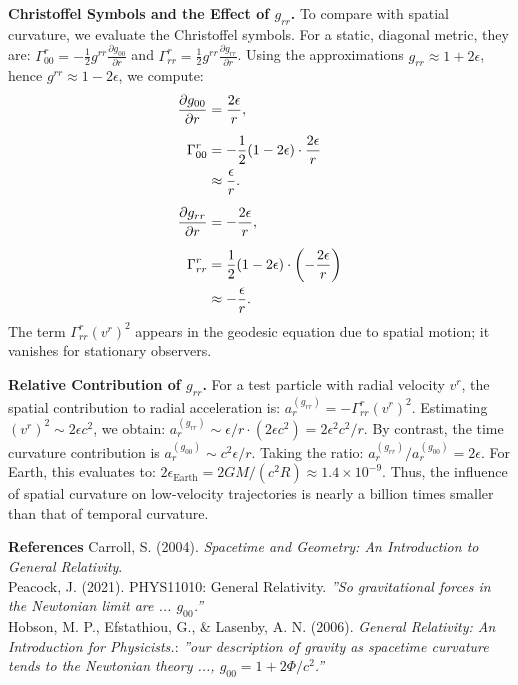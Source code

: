 \begin{technical}
    \textbf{Christoffel Symbols and the Effect of \( g_{rr} \).}  
    To compare with spatial curvature, we evaluate the Christoffel symbols. For a static, diagonal metric, they are: \( \Gamma^r_{00} = -\frac{1}{2} g^{rr} \frac{\partial g_{00}}{\partial r} \) and \( \Gamma^r_{rr} = \frac{1}{2} g^{rr} \frac{\partial g_{rr}}{\partial r} \).
    Using the approximations \( g_{rr} \approx 1 + 2\epsilon \), hence \( g^{rr} \approx 1 - 2\epsilon \), we compute:
    \begin{align}
    \frac{\partial g_{00}}{\partial r} &= \frac{2\epsilon}{r}, \\[0.5em]
    \Gamma^r_{00} &= -\frac{1}{2} (1 - 2\epsilon) \cdot \frac{2\epsilon}{r} \notag \\
    &\approx \frac{\epsilon}{r}. \\[0.5em]
    \frac{\partial g_{rr}}{\partial r} &= -\frac{2\epsilon}{r}, \\[0.5em]
    \Gamma^r_{rr} &= \frac{1}{2} (1 - 2\epsilon) \cdot \left(-\frac{2\epsilon}{r} \right) \notag \\
    &\approx -\frac{\epsilon}{r}.
    \end{align}
    The term \( \Gamma^r_{rr} (v^r)^2 \) appears in the geodesic equation due to spatial motion; it vanishes for stationary observers.
    
    \textbf{Relative Contribution of \( g_{rr} \).}  
    For a test particle with radial velocity \( v^r \), the spatial contribution to radial acceleration is: \( a_r^{(g_{rr})} = -\Gamma^r_{rr} (v^r)^2 \).
    Estimating \( (v^r)^2 \sim 2\epsilon c^2 \), we obtain: \( a_r^{(g_{rr})} \sim \epsilon/r \cdot (2\epsilon c^2) = 2\epsilon^2 c^2/r \).
    By contrast, the time curvature contribution is \( a_r^{(g_{00})} \sim c^2 \epsilon/r \). Taking the ratio: \( a_r^{(g_{rr})}/a_r^{(g_{00})} = 2\epsilon \).
    For Earth, this evaluates to: \( 2\epsilon_{\text{Earth}} = 2GM/(c^2 R) \approx 1.4 \times 10^{-9} \).
    Thus, the influence of spatial curvature on low-velocity trajectories is nearly a billion times smaller than that of temporal curvature.
    
    \vspace{0.5em}
    \noindent\textbf{References}  
    Carroll, S. (2004). \textit{Spacetime and Geometry: An Introduction to General Relativity}. \\
    Peacock, J. (2021). PHYS11010: General Relativity. \textit{''So gravitational forces in the Newtonian limit are ... $g_{00}$.''}\\
    Hobson, M. P., Efstathiou, G., \& Lasenby, A. N. (2006). \textit{General Relativity: An Introduction for Physicists.}: \textit{''our description of gravity as spacetime curvature tends to the Newtonian theory ..., $g_{00} = 1 + 2\Phi/c^2$.''}
    \end{technical}    